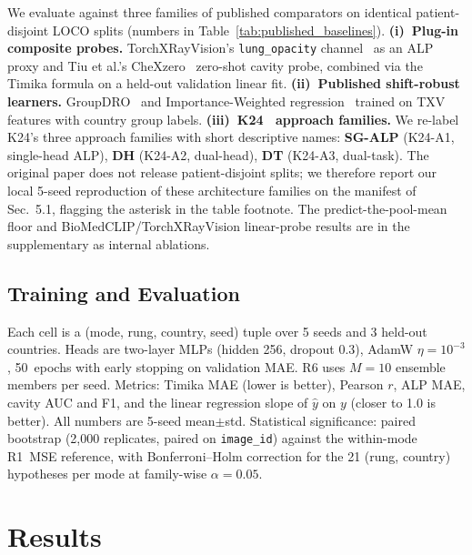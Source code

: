 \documentclass[runningheads]{llncs}
\begin{document}
We evaluate against three families of published comparators on identical patient-disjoint LOCO splits (numbers in Table~\ref{tab:published_baselines}). \textbf{(i)~Plug-in composite probes.} TorchXRayVision's \texttt{lung\_opacity} channel~\cite{cohen2022torchxrayvision} as an ALP proxy and Tiu et al.'s CheXzero~\cite{tiu2022chexzero} zero-shot cavity probe, combined via the Timika formula on a held-out validation linear fit. \textbf{(ii)~Published shift-robust learners.} GroupDRO~\cite{sagawa2020distributionally} and Importance-Weighted regression~\cite{shimodaira2000improving} trained on TXV features with country group labels. \textbf{(iii)~K24~\cite{kantipudi2024} approach families.} We re-label K24's three approach families with short descriptive names: \textbf{SG-ALP} (K24-A1, single-head ALP), \textbf{DH} (K24-A2, dual-head), \textbf{DT} (K24-A3, dual-task). The original paper does not release patient-disjoint splits; we therefore report our local 5-seed reproduction of these architecture families on the manifest of Sec.~5.1, flagging the asterisk in the table footnote. The predict-the-pool-mean floor and BioMedCLIP/TorchXRayVision linear-probe results are in the supplementary as internal ablations.

\subsection{Training and Evaluation}

Each cell is a (mode, rung, country, seed) tuple over 5 seeds and 3 held-out countries. Heads are two-layer MLPs (hidden 256, dropout 0.3), AdamW $\eta{=}10^{-3}$, 50~epochs with early stopping on validation MAE. R6 uses $M{=}10$ ensemble members per seed. Metrics: Timika MAE (lower is better), Pearson $r$, ALP MAE, cavity AUC and F1, and the linear regression slope of $\hat{y}$ on $y$ (closer to 1.0 is better). All numbers are 5-seed mean$\pm$std. Statistical significance: paired bootstrap (2{,}000 replicates, paired on \texttt{image\_id}) against the within-mode R1~MSE reference, with Bonferroni--Holm correction for the 21 (rung, country) hypotheses per mode at family-wise $\alpha = 0.05$.

\section{Results}
\label{sec:results}
\end{document}
